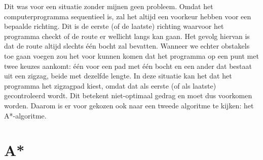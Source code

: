 \documentclass{report}
\begin{document}
Dit was voor een situatie zonder mijnen geen probleem. Omdat het computerprogramma sequentieel is, zal het altijd een voorkeur hebben voor een bepaalde richting. Dit is de eerste (of de laatste) richting waarvoor het programma checkt of de route er wellicht langs kan gaan. Het gevolg hiervan is dat de route altijd slechts één bocht zal bevatten. Wanneer we echter obstakels toe gaan voegen zou het voor kunnen komen dat het programma op een punt met twee keuzes aankomt: één voor een pad met één bocht en een ander dat bestaat uit een zigzag, beide met dezelfde lengte. In deze situatie kan het dat het programma het zigzagpad kiest, omdat dat als eerste (of als laatste) gecontroleerd wordt. Dit betekent niet-optimaal gedrag en moet dus voorkomen worden. Daarom is er voor gekozen ook naar een tweede algoritme te kijken: het A*-algoritme.

\section{A*}
\label{sec:astar}
\end{document}
